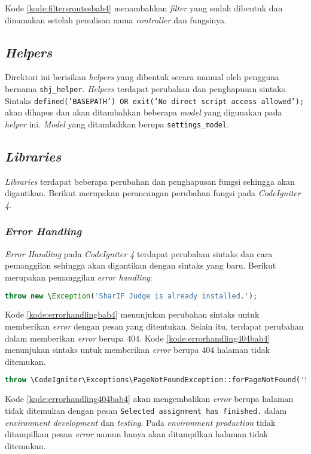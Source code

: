 Kode \ref{kode:filtersroutesbab4} menambahkan \textit{filter} yang sudah dibentuk dan dinamakan setelah penulisan nama \textit{controller} dan fungsinya. 

\subsection{\textit{Helpers}}
Direktori ini berisikan \textit{helpers} yang dibentuk secara manual oleh pengguna bernama \texttt{shj\_helper}. \textit{Helpers} terdapat perubahan dan penghapusan sintaks. Sintaks \texttt{defined('BASEPATH') OR exit('No direct script access allowed');} akan dihapus dan akan ditambahkan beberapa \textit{model} yang digunakan pada \textit{helper} ini. \textit{Model} yang ditambahkan berupa \texttt{settings\_model}.

\subsection{\textit{Libraries}}
\textit{Libraries} terdapat beberapa perubahan dan penghapusan fungsi sehingga akan digantikan. Berikut merupakan perancangan perubahan fungsi pada \textit{CodeIgniter 4}.

\subsubsection{\textit{Error Handling}}
\textit{Error Handling} pada \textit{CodeIgniter 4} terdapat perubahan sintaks dan cara pemanggilan sehingga akan digantikan dengan sintaks yang baru. Berikut merupakan pemanggilan \textit{error handling}:
\begin{lstlisting}[language=PHP, caption=Perubahan sintaks \textit{error handling}, label=kode:errorhandlingbab4]
	throw new \Exception('SharIF Judge is already installed.');
\end{lstlisting}
Kode \ref{kode:errorhandlingbab4} menunjukan perubahan sintaks untuk memberikan \textit{error} dengan pesan yang ditentukan. Selain itu, terdapat perubahan dalam memberikan \textit{error} berupa 404. Kode \ref{kode:errorhandling404bab4} menunjukan sintaks untuk memberikan \textit{error} berupa 404 halaman tidak ditemukan.
\begin{lstlisting}[language=PHP, caption=Perubahan sintaks \textit{error handling} 404, label=kode:errorhandling404bab4]
	throw \CodeIgniter\Exceptions\PageNotFoundException::forPageNotFound('Selected assignment has finished.');
\end{lstlisting}
Kode \ref{kode:errorhandling404bab4} akan mengembalikan \textit{error} berupa halaman tidak ditemukan dengan pesan \texttt{Selected assignment has finished.} dalam \textit{environment development} dan \textit{testing}. Pada \textit{environment production} tidak ditampilkan pesan \textit{error} namun hanya akan ditampilkan halaman tidak ditemukan.

